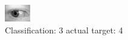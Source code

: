 \begin{figure}[h!]
\begin{center}
\includegraphics[width=0.60\columnwidth]{figures/ID763_class_3_target_4.png}
\end{center}
\caption{ Classification: 3 actual target: 4}
\label{fig:ID763_class_3_target_4}
\end{figure}
